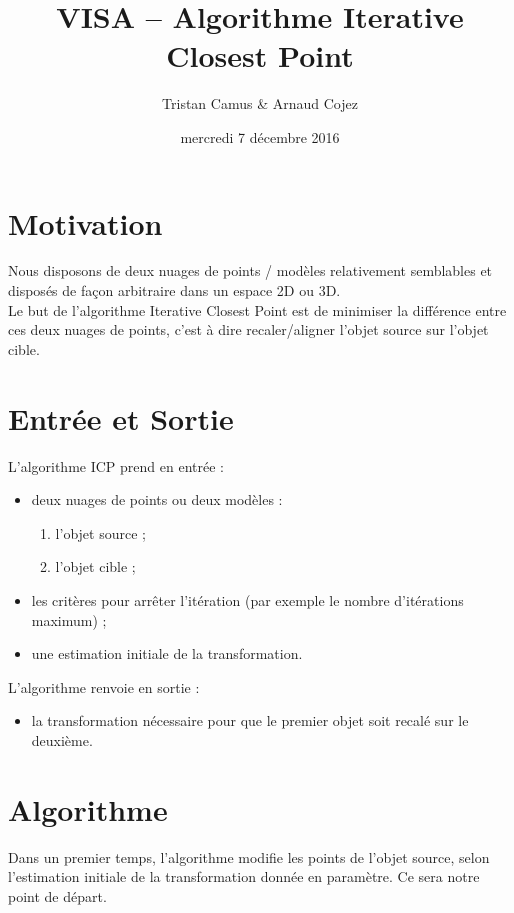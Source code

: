 \documentclass[a4paper]{article}
\begin{document}
\title{VISA -- Algorithme Iterative Closest Point}
\author{Tristan Camus \& Arnaud Cojez}
\date{mercredi 7 décembre 2016}

\maketitle


\section{Motivation}
Nous disposons de deux nuages de points / modèles relativement semblables et disposés de façon arbitraire dans un espace 2D ou 3D.\\
Le but de l'algorithme Iterative Closest Point est de minimiser la différence entre ces deux nuages de points, c'est à dire recaler/aligner l'objet source sur l'objet cible.

\section{Entrée et Sortie}
L'algorithme ICP prend en entrée :
\begin{itemize}
  \item deux nuages de points ou deux modèles :
  \begin{enumerate}
    \item l'objet source ;
    \item l'objet cible ;
  \end{enumerate}
  \item les critères pour arrêter l'itération (par exemple le nombre d'itérations maximum) ;
  \item une estimation initiale de la transformation.\\
\end{itemize}

L'algorithme renvoie en sortie :
\begin{itemize}
  \item la transformation nécessaire pour que le premier objet soit recalé sur le deuxième.
\end{itemize}

\section{Algorithme}
Dans un premier temps, l'algorithme modifie les points de l'objet source, selon l'estimation initiale de la transformation donnée en paramètre. Ce sera notre point de départ.\\
\end{document}
